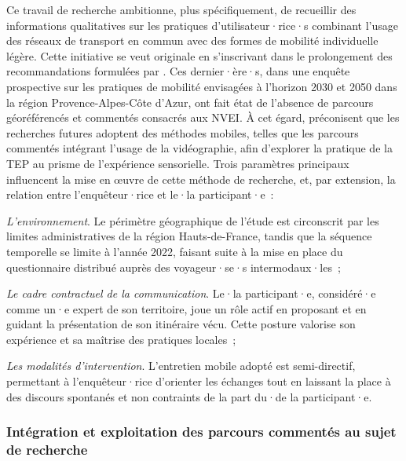 \begin{refsegment}
Ce travail de recherche ambitionne, plus spécifiquement, de recueillir des informations qualitatives sur les pratiques d'utilisateur·rice·s combinant l’usage des réseaux de transport en commun avec des formes de mobilité individuelle légère. Cette initiative se veut originale en s'inscrivant dans le prolongement des recommandations formulées par \textcolor{blue}{\textcite[11]{pages_nouveaux_2021}}. Ces dernier·ère·s, dans une enquête prospective sur les pratiques de mobilité envisagées à l'horizon 2030 et 2050 dans la région Provence-Alpes-Côte d’Azur, ont fait état de l'absence de parcours géoréférencés et commentés consacrés aux \acrfull{NVEI}. À cet égard, \textcolor{blue}{\textcite[13]{gibson_blurred_2021}} préconisent que les recherches futures adoptent des méthodes mobiles, telles que les parcours commentés intégrant l’usage de la vidéographie, afin d’explorer la pratique de la \acrshort{TEP} au prisme de l’expérience sensorielle. Trois paramètres principaux influencent la mise en œuvre de cette méthode de recherche, et, par extension, la relation entre l’enquêteur·rice et le·la participant·e~:
\begin{customitemize}
    \item \textsl{L’environnement}. Le périmètre géographique de l’étude est circonscrit par les limites administratives de la région Hauts-de-France, tandis que la séquence temporelle se limite à l'année 2022, faisant suite à la mise en place du questionnaire distribué auprès des voyageur·se·s intermodaux·les~;
    \item \textsl{Le cadre contractuel de la communication}. Le·la participant·e, considéré·e comme un·e expert de son territoire, joue un rôle actif en proposant et en guidant la présentation de son itinéraire vécu. Cette posture valorise son expérience et sa maîtrise des pratiques locales~;
    \item \textsl{Les modalités d’intervention}. L’entretien mobile adopté est semi-directif, permettant à l’enquêteur·rice d’orienter les échanges tout en laissant la place à des discours spontanés et non contraints de la part du·de la participant·e.
\end{customitemize}%

\subsubsection*{Intégration et exploitation des parcours commentés au sujet de recherche
    \label{chap3:parcours-commente-administration-methode}
    }


\end{refsegment}
